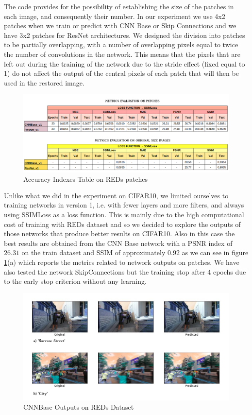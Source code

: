 \documentclass[12pt,a4paper]{article}
\begin{document}
The code provides for the possibility of establishing the size of the patches in each image, and consequently their number. In our experiment we use 4x2 patches when we train or predict with CNN Base or Skip Connections and we have 3x2 patches for ResNet architectures. We designed the division into patches to be partially overlapping, with a number of overlapping pixels equal to twice the number of convolutions in the network. This means that the pixels that are left out during the training of the network due to the stride effect (fixed equal to 1) do not affect the output of the central pixels of each patch that will then be used in the restored image.

\begin{figure}[hptb]
\centering
\includegraphics[scale=0.45]{REDs_table.png} 
\caption{Accuracy Indexes Table on REDs patches}
\label{REDs_table}
\end{figure}

Unlike what we did in the experiment on CIFAR10, we limited ourselves to training networks in version 1, i.e. with fewer layers and more filters, and always using SSIMLoss as a loss function. This is mainly due to the high computational cost of training with REDs dataset and so we decided to explore the outputs of those networks that produce better results on CIFAR10. Also in this case the best results are obtained from the CNN Base network with a PSNR index of $26.31$ on the train dataset and SSIM of approximately $0.92$ as we can see in figure \ref{REDs_table}(a) which reports the metrics related to network outputs on patches. We have also tested the network SkipConnections but the training stop after 4 epochs due to the early stop criterion without any learning.

\begin{figure}[hptb]
\centering
\includegraphics[scale=0.48]{REDs_CNNBase_Outputs.png} 
\caption{CNNBase Outputs on REDs Dataset}
\label{REDs_outputs_CNNBase}
\end{figure}
\end{document}
